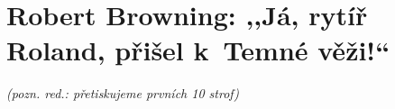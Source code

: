\section{Robert Browning: ,,Já, rytíř \\ Roland, přišel k~Temné věži!``}

\noindent


\noindent
\textit{(pozn. red.: přetiskujeme prvních 10 strof)}

\medskip



